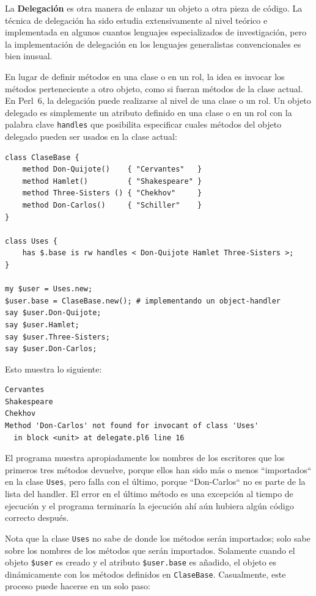La {\bf Delegación} es otra manera de enlazar un objeto a otra pieza 
de código. La técnica de delegación ha sido estudia extensivamente 
al nivel teórico e implementada en algunos cuantos lenguajes 
especializados de investigación, pero la implementación de
delegación en los lenguajes generalistas convencionales
es bien inusual.

En lugar de definir métodos en una clase o en un rol, la idea 
es invocar los métodos perteneciente a otro objeto, como si fueran
métodos de la clase actual. En Perl~6, la delegación puede realizarse
al nivel de una clase o un rol. Un objeto delegado es simplemente
un atributo definido en una clase o en un rol con la palabra clave
{\tt handles} que posibilita especificar cuales métodos del objeto 
delegado pueden ser usados en la clase actual:

  
   
  
\begin{lstlisting}
class ClaseBase {
    method Don-Quijote()    { "Cervantes"   }
    method Hamlet()         { "Shakespeare" }
    method Three-Sisters () { "Chekhov"     }
    method Don-Carlos()     { "Schiller"    }
}

class Uses { 
    has $.base is rw handles < Don-Quijote Hamlet Three-Sisters >;
}

my $user = Uses.new;
$user.base = ClaseBase.new(); # implementando un object-handler
say $user.Don-Quijote;
say $user.Hamlet;
say $user.Three-Sisters;
say $user.Don-Carlos;
\end{lstlisting}

Esto muestra lo siguiente:

\begin{lstlisting}
Cervantes
Shakespeare
Chekhov
Method 'Don-Carlos' not found for invocant of class 'Uses'
  in block <unit> at delegate.pl6 line 16
\end{lstlisting}

El programa muestra apropiadamente los nombres de los
escritores que los primeros tres métodos devuelve, porque ellos
han sido más o menos ``importados`` en la clase {\tt Uses}, pero 
falla con el último, porque ``Don-Carlos`` no es parte de la 
lista del handler. El error en el último método es una excepción al
tiempo de ejecución y el programa terminaría la ejecución ahí aún
hubiera algún código correcto después. 

Nota que la clase {\tt Uses} no sabe de donde los métodos 
serán importados; solo sabe sobre los nombres de los 
métodos que serán importados. Solamente cuando el objeto
\verb|$user| es creado y el atributo \verb|$user.base|
es añadido, el objeto es dinámicamente con los métodos
definidos en {\tt ClaseBase}. Casualmente, este proceso
puede hacerse en un solo paso:

